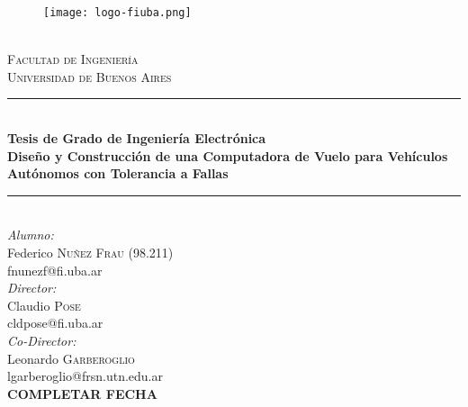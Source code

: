 \begin{titlepage}
\newcommand{\HRule}{\rule{\linewidth}{0.5mm}}
\center
\begin{figure}[H]
    \centering
    \texttt{[image: logo-fiuba.png]}
\end{figure}
\qquad \\[0.1cm]

\textsc{\LARGE Facultad de Ingeniería}\\[0.5cm]
\textsc{\Large Universidad de Buenos Aires}\\[0.6cm]
\HRule \\[0.3cm]
{ \Large \bfseries Tesis de Grado de Ingeniería Electrónica} \\[0.3cm]
{ \Large \bfseries Diseño y Construcción de una Computadora de Vuelo para Vehículos Autónomos con Tolerancia a Fallas}\\[0.1cm]
\HRule \\[0.2cm]
\Large \emph{Alumno:}\\[0,1cm]
\large Federico \textsc{Nuñez Frau} (98.211) \\
\normalsize fnunezf@fi.uba.ar\\[0.75cm]
\Large \emph{Director:}\\[0,1cm]
\large Claudio \textsc{Pose} \\[0.25cm]
\normalsize cldpose@fi.uba.ar\\[0.25cm]
\Large \emph{Co-Director:}\\[0,1cm]
\large Leonardo \textsc{Garberoglio} \\[0.25cm]
\normalsize lgarberoglio@frsn.utn.edu.ar\\[0.25cm]
\vfill
\Large \textbf{{\color{red} COMPLETAR FECHA}}
\end{titlepage}
